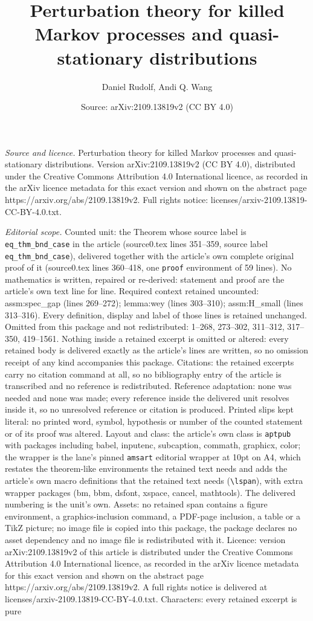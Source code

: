 \documentclass[10pt,a4paper]{amsart}
\title[Perturbation theory for killed Markov processes and quasi-st]{Perturbation theory for killed Markov processes and quasi-stationary distributions}
\author{Daniel Rudolf, Andi Q. Wang}
\date{Source: arXiv:2109.13819v2 (CC BY 4.0)}
\begin{document}
\maketitle

\noindent\emph{Source and licence.} Perturbation theory for killed Markov processes and quasi-stationary distributions. Version arXiv:2109.13819v2 (CC BY 4.0), distributed under the Creative Commons Attribution 4.0 International licence, as recorded in the arXiv licence metadata for this exact version and shown on the abstract page https://arxiv.org/abs/2109.13819v2. Full rights notice: licenses/arxiv-2109.13819-CC-BY-4.0.txt.\par\smallskip

\noindent\textit{Editorial scope.} Counted unit: the Theorem whose source label is \texttt{eq\_thm\_bnd\_case} in the article (source0.tex lines 351--359, source label \texttt{eq\_thm\_bnd\_case}), delivered together with the article's own complete original proof of it (source0.tex lines 360--418, one \texttt{proof} environment of 59 lines). No mathematics is written, repaired or re-derived: statement and proof are the article's own text line for line. Required context retained uncounted: assm:spec\_gap (lines 269--272); lemma:wey (lines 303--310); assm:H\_small (lines 313--316). Every definition, display and label of those lines is retained unchanged. Omitted from this package and not redistributed: 1--268, 273--302, 311--312, 317--350, 419--1561. Nothing inside a retained excerpt is omitted or altered: every retained body is delivered exactly as the article's lines are written, so no omission receipt of any kind accompanies this package. Citations: the retained excerpts carry no citation command at all, so no bibliography entry of the article is transcribed and no reference is redistributed. Reference adaptation: none was needed and none was made; every reference inside the delivered unit resolves inside it, so no unresolved reference or citation is produced. Printed slips kept literal: no printed word, symbol, hypothesis or number of the counted statement or of its proof was altered. Layout and class: the article's own class is \texttt{aptpub} with packages including babel, inputenc, subcaption, commath, graphicx, color; the wrapper is the lane's pinned \texttt{amsart} editorial wrapper at 10pt on A4, which restates the theorem-like environments the retained text needs and adds the article's own macro definitions that the retained text needs (\texttt{\textbackslash lspan}), with extra wrapper packages (bm, bbm, dsfont, xspace, cancel, mathtools). The delivered numbering is the unit's own. Assets: no retained span contains a figure environment, a graphics-inclusion command, a PDF-page inclusion, a table or a TikZ picture; no image file is copied into this package, the package declares no asset dependency and no image file is redistributed with it. Licence: version arXiv:2109.13819v2 of this article is distributed under the Creative Commons Attribution 4.0 International licence, as recorded in the arXiv licence metadata for this exact version and shown on the abstract page https://arxiv.org/abs/2109.13819v2. A full rights notice is delivered at licenses/arxiv-2109.13819-CC-BY-4.0.txt. Characters: every retained excerpt is pure 
\end{document}
